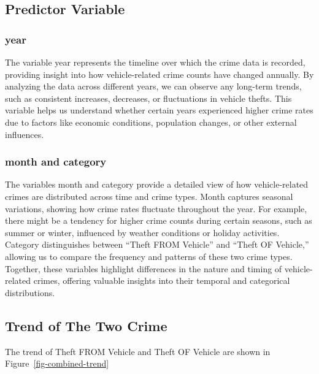 \documentclass[
  letterpaper,
  DIV=11,
  numbers=noendperiod]{scrartcl}
\begin{document}
\subsection{Predictor Variable}\label{predictor-variable}

\subsubsection{year}\label{year}

The variable year represents the timeline over which the crime data is
recorded, providing insight into how vehicle-related crime counts have
changed annually. By analyzing the data across different years, we can
observe any long-term trends, such as consistent increases, decreases,
or fluctuations in vehicle thefts. This variable helps us understand
whether certain years experienced higher crime rates due to factors like
economic conditions, population changes, or other external influences.

\subsubsection{month and category}\label{month-and-category}

The variables month and category provide a detailed view of how
vehicle-related crimes are distributed across time and crime types.
Month captures seasonal variations, showing how crime rates fluctuate
throughout the year. For example, there might be a tendency for higher
crime counts during certain seasons, such as summer or winter,
influenced by weather conditions or holiday activities. Category
distinguishes between ``Theft FROM Vehicle'' and ``Theft OF Vehicle,''
allowing us to compare the frequency and patterns of these two crime
types. Together, these variables highlight differences in the nature and
timing of vehicle-related crimes, offering valuable insights into their
temporal and categorical distributions.

\subsection{Trend of The Two Crime}\label{trend-of-the-two-crime}

The trend of Theft FROM Vehicle and Theft OF Vehicle are shown in
Figure~\ref{fig-combined-trend}
\end{document}

